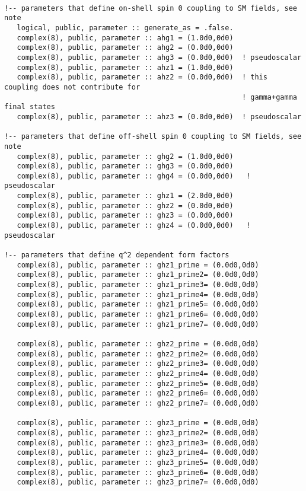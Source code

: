 \documentclass[aps,superscriptaddress,nofootinbib]{revtex4}
\begin{document}
\begin{verbatim}

!-- parameters that define on-shell spin 0 coupling to SM fields, see note
   logical, public, parameter :: generate_as = .false.
   complex(8), public, parameter :: ahg1 = (1.0d0,0d0)
   complex(8), public, parameter :: ahg2 = (0.0d0,0d0)
   complex(8), public, parameter :: ahg3 = (0.0d0,0d0)  ! pseudoscalar
   complex(8), public, parameter :: ahz1 = (1.0d0,0d0)
   complex(8), public, parameter :: ahz2 = (0.0d0,0d0)  ! this coupling does not contribute for
                                                        ! gamma+gamma final states
   complex(8), public, parameter :: ahz3 = (0.0d0,0d0)  ! pseudoscalar

!-- parameters that define off-shell spin 0 coupling to SM fields, see note
   complex(8), public, parameter :: ghg2 = (1.0d0,0d0)
   complex(8), public, parameter :: ghg3 = (0.0d0,0d0)
   complex(8), public, parameter :: ghg4 = (0.0d0,0d0)   ! pseudoscalar
   complex(8), public, parameter :: ghz1 = (2.0d0,0d0)
   complex(8), public, parameter :: ghz2 = (0.0d0,0d0)
   complex(8), public, parameter :: ghz3 = (0.0d0,0d0)
   complex(8), public, parameter :: ghz4 = (0.0d0,0d0)   ! pseudoscalar

!-- parameters that define q^2 dependent form factors
   complex(8), public, parameter :: ghz1_prime = (0.0d0,0d0)
   complex(8), public, parameter :: ghz1_prime2= (0.0d0,0d0)
   complex(8), public, parameter :: ghz1_prime3= (0.0d0,0d0)
   complex(8), public, parameter :: ghz1_prime4= (0.0d0,0d0)
   complex(8), public, parameter :: ghz1_prime5= (0.0d0,0d0)
   complex(8), public, parameter :: ghz1_prime6= (0.0d0,0d0)
   complex(8), public, parameter :: ghz1_prime7= (0.0d0,0d0)

   complex(8), public, parameter :: ghz2_prime = (0.0d0,0d0)
   complex(8), public, parameter :: ghz2_prime2= (0.0d0,0d0)
   complex(8), public, parameter :: ghz2_prime3= (0.0d0,0d0)
   complex(8), public, parameter :: ghz2_prime4= (0.0d0,0d0)
   complex(8), public, parameter :: ghz2_prime5= (0.0d0,0d0)
   complex(8), public, parameter :: ghz2_prime6= (0.0d0,0d0)
   complex(8), public, parameter :: ghz2_prime7= (0.0d0,0d0)

   complex(8), public, parameter :: ghz3_prime = (0.0d0,0d0)
   complex(8), public, parameter :: ghz3_prime2= (0.0d0,0d0)
   complex(8), public, parameter :: ghz3_prime3= (0.0d0,0d0)
   complex(8), public, parameter :: ghz3_prime4= (0.0d0,0d0)
   complex(8), public, parameter :: ghz3_prime5= (0.0d0,0d0)
   complex(8), public, parameter :: ghz3_prime6= (0.0d0,0d0)
   complex(8), public, parameter :: ghz3_prime7= (0.0d0,0d0)


\end{verbatim}
\end{document}
